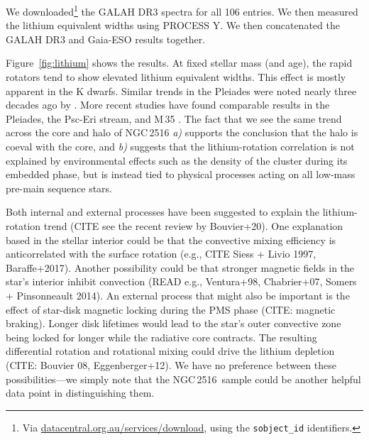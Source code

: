 \documentclass[12pt,twocolumn,tighten]{aastex63}
\newcommand{\cn}{NGC\,2516} %
\begin{document}
We downloaded\footnote{Via \url{datacentral.org.au/services/download},
using the \texttt{sobject\_id} identifiers.}
the GALAH DR3 spectra for all 106 entries.
We then measured the lithium equivalent widths using PROCESS Y.
We then concatenated the GALAH DR3 and Gaia-ESO results together.

Figure~\ref{fig:lithium} shows the results.  At fixed stellar mass
(and age), the rapid rotators tend to show elevated lithium equivalent
widths. This effect is mostly apparent in the K dwarfs.  Similar
trends in the Pleiades were noted nearly three decades ago by
\citet{soderblom_evolution_1993}.  More recent studies have found
comparable results in the Pleiades, the Psc-Eri stream, and M\,35
\citep{bouvier_pleiades_lirot_2018,arancibia_2020,jeffries_m35_li_2020}.
The fact that we see the same trend across the core and halo of \cn
{\it a)} supports the conclusion that the halo is coeval with the
core, and {\it b)} suggests that the lithium-rotation correlation is
not explained by environmental effects such as the density of the cluster
during its embedded phase, but is instead tied to physical processes
acting on all low-mass pre-main sequence stars.

Both internal and external processes have been suggested to explain
the lithium-rotation trend (CITE see the recent review by Bouvier+20).
One explanation based in the stellar interior could be that the
convective mixing efficiency is anticorrelated with the surface
rotation (e.g., CITE Siess + Livio 1997, Baraffe+2017).  Another
possibility could be that stronger magnetic fields in the star's
interior inhibit convection (READ e.g., Ventura+98, Chabrier+07,
Somers + Pinsonneault 2014).  An external process that might also be
important is the effect of star-disk magnetic locking during the PMS
phase (CITE: magnetic braking).  Longer disk lifetimes would lead to
the star's outer convective zone being locked for longer while the
radiative core contracts.  The resulting differential rotation and
rotational mixing could drive the lithium depletion (CITE: Bouvier 08,
Eggenberger+12).
We have no preference between these possibilities---we simply note
that the \cn\ sample could be another helpful data point in
distinguishing them.
\end{document}
